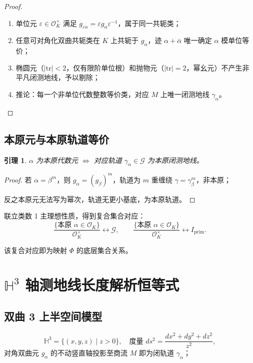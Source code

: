 \documentclass[12pt,a4paper]{article}
\newtheorem{lemma}[theorem]{引理}
\begin{document}
\begin{proof}
\begin{enumerate}[label=\arabic*.]
\item 单位元 $\varepsilon \in \mathcal{O}_K^\times$ 满足 $g_{\varepsilon\alpha} = \varepsilon g_\alpha \varepsilon^{-1}$，属于同一共轭类；
\item 任意可对角化双曲共轭类在 $K$ 上共轭于 $g_\alpha$，迹 $\alpha + \bar{\alpha}$ 唯一确定 $\alpha$ 模单位等价；
\item 椭圆元（$|\mathrm{tr}| < 2$，仅有限阶单位根）和抛物元（$|\mathrm{tr}| = 2$，幂幺元）不产生非平凡闭测地线，予以剔除；
\item 推论：每一个非单位代数整数等价类，对应 $M$ 上唯一闭测地线 $\gamma_\alpha$。
\end{enumerate}
\end{proof}

\subsection{本原元与本原轨道等价}

\begin{lemma}
$\alpha$ 为本原代数元 $\iff$ 对应轨道 $\gamma_\alpha \in \mathcal{G}$ 为本原闭测地线。
\end{lemma}

\begin{proof}
若 $\alpha = \beta^m$，则 $g_\alpha = (g_\beta)^m$，轨道为 $m$ 重缠绕 $\gamma = \gamma_\beta^m$，非本原；

反之本原元无法写为幂次，轨道无更小基底，为本原轨道。
\end{proof}

联立类数 1 主理想性质，得到复合集合对应：
\[
\frac{\{\text{本原 } \alpha \in \mathcal{O}_K\}}{\mathcal{O}_K^\times} \longleftrightarrow \mathcal{G}, \qquad
\frac{\{\text{本原 } \alpha \in \mathcal{O}_K\}}{\mathcal{O}_K^\times} \longleftrightarrow I_{\mathrm{prim}}.
\]

该复合对应即为映射 $\Phi$ 的底层集合关系。

\section{$\mathbb{H}^3$ 轴测地线长度解析恒等式}

\subsection{双曲 3 上半空间模型}

\[
\mathbb{H}^3 = \{(x, y, z) \mid z > 0\}, \quad \text{度量 } ds^2 = \frac{dx^2 + dy^2 + dz^2}{z^2},
\]
对角双曲元 $g_\alpha$ 的不动竖直轴投影至商流 $M$ 即为闭轨道 $\gamma_\alpha$；
\end{document}

